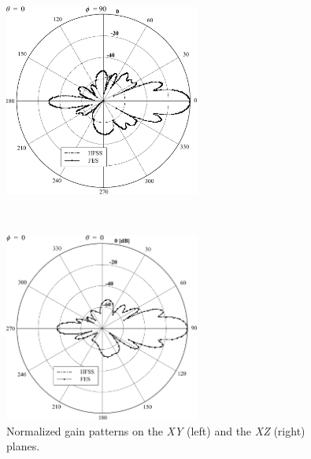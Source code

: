 \begin{figure}[h!]
\centering
\begin{minipage}{6.5cm}
\includegraphics[width=6.4cm]{Polar2}
\end{minipage}
\
\begin{minipage}{6.5cm}
\includegraphics[width=6.4cm]{Polar1}
\end{minipage}
\caption{Normalized gain patterns on the \textit{XY} (left) and the \textit{XZ} (right) planes.}
\label{fig:Polar}
\end{figure}



%
%

